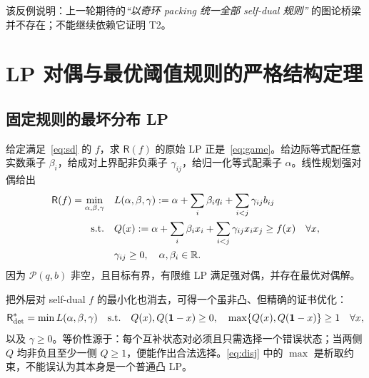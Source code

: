 \documentclass[11pt,a4paper]{ctexart}
\theoremstyle{definition}
\newcommand{\calP}{\mathcal P}
\newcommand{\one}{\mathbf 1}
\newcommand{\Risk}{\mathsf R}
\begin{document}
该反例说明：上一轮期待的\emph{“以奇环 packing 统一全部 self-dual 规则”} 的图论桥梁并不存在；不能继续依赖它证明 T2。

\section{LP 对偶与最优阈值规则的严格结构定理}
\subsection{固定规则的最坏分布 LP}
给定满足~\eqref{eq:sd} 的 $f$，求 $\Risk(f)$ 的原始 LP 正是~\eqref{eq:game}。给边际等式配任意实数乘子 $\beta_i$，给成对上界配非负乘子 $\gamma_{ij}$，给归一化等式配乘子 $\alpha$。线性规划强对偶给出
\begin{align}\label{eq:dual}
\Risk(f)=\min_{\alpha,\beta,\gamma}\quad&
L(\alpha,\beta,\gamma)
:=\alpha+\sum_i\beta_iq_i+\sum_{i<j}\gamma_{ij}b_{ij}\\
\text{s.t.}\quad&
Q(x):=\alpha+\sum_i\beta_ix_i+\sum_{i<j}\gamma_{ij}x_ix_j\ge f(x)\quad\forall x,\notag\\
&\gamma_{ij}\ge0,\quad\alpha,\beta_i\in\mathbb R.\notag
\end{align}
因为 $\calP(q,b)$ 非空，且目标有界，有限维 LP 满足强对偶，并存在最优对偶解。

把外层对 self-dual $f$ 的最小化也消去，可得一个虽非凸、但精确的证书优化：
\begin{equation}\label{eq:disj}
\Risk^*_{\rm det}=\min L(\alpha,\beta,\gamma)
\quad\text{s.t.}\quad
Q(x),Q(\one-x)\ge0,\quad
\max\{Q(x),Q(\one-x)\}\ge1\quad\forall x,
\end{equation}
以及 $\gamma\ge0$。等价性源于：每个互补状态对必须且只需选择一个错误状态；当两侧 $Q$ 均非负且至少一侧 $Q\ge1$，便能作出合法选择。\eqref{eq:disj} 中的 $\max$ 是析取约束，不能误认为其本身是一个普通凸 LP。
\end{document}
